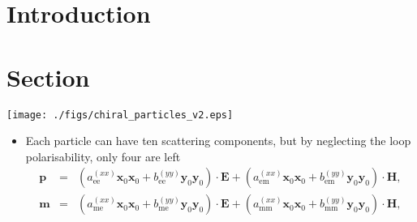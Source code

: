 \documentclass[portrait,a1,final]{a0poster} %
\newcommand{\vt}[1]{\ensuremath{\mathbf{#1}}} %
\newcommand{\lt}[1]{\ensuremath{\mathrm{#1}}} %
\newcommand{\unitx}{\ensuremath{\vt{x}_0}}
\newcommand{\unity}{\ensuremath{\vt{y}_0}}
\newcommand{\sectionspace}{10mm} %
\newcommand{\figurespace}{10mm} %
\begin{document}

\vspace{0.08\linewidth}

\centering



\small %


\begin{minipage}{0.98\linewidth}




\begin{minipage}[t]{0.47\linewidth}
\setlength{\parindent}{10mm} %




\section{Introduction}

\lipsum[1]


\vspace{\sectionspace}
\section{Section}

\lipsum[2]


\vspace{\figurespace}
\begin{center}
  \texttt{[image: ./figs/chiral\_particles\_v2.eps]}
\end{center}
\vspace{\figurespace}




\begin{itemize}
	\item Each particle can have ten scattering components, but by neglecting the loop polarisability, only four are left \cite{Tretyakov1996}
	\setlength\arraycolsep{2pt}
	\begin{eqnarray}
		\vt{p} & = & (a_\lt{ee}^{(xx)} \unitx\unitx + b_\lt{ee}^{(yy)} \unity\unity) \cdot \vt{E} + (a_\lt{em}^{(xx)} \unitx\unitx + b_\lt{em}^{(yy)} \unity\unity) \cdot \vt{H},
		\label{eq:psimple} \\
		\vt{m} & = & (a_\lt{me}^{(xx)} \unitx\unitx + b_\lt{me}^{(yy)} \unity\unity) \cdot \vt{E} + (a_\lt{mm}^{(xx)} \unitx\unitx + b_\lt{mm}^{(yy)} \unity\unity) \cdot \vt{H},
		\label{eq:msimple}
	\end{eqnarray}
\end{itemize}





\end{minipage}
\end{minipage}
\end{document}
